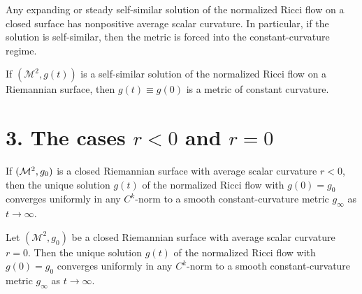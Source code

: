 \begin{proposition}
\label{ch05-prop-self-similar-solutions-constant-curvature}
Any expanding or steady self-similar solution of the normalized Ricci flow on a closed surface has nonpositive average scalar curvature. In particular, if the solution is self-similar, then the metric is forced into the constant-curvature regime.
\end{proposition}

\begin{proposition}
\label{ch05-prop-self-similar-constant-curvature}
If \((\mathcal{M}^2,g(t))\) is a self-similar solution of the normalized Ricci flow on a Riemannian surface, then \(g(t)\equiv g(0)\) is a metric of constant curvature.
\end{proposition}

\section*{3. The cases \(r<0\) and \(r=0\)}

\begin{theorem}
\label{ch05-thm-negative-average-curvature}
If \((\mathcal{M}^2,g_0)\) is a closed Riemannian surface with average scalar curvature \(r<0\), then the unique solution \(g(t)\) of the normalized Ricci flow with \(g(0)=g_0\) converges uniformly in any \(C^k\)-norm to a smooth constant-curvature metric \(g_\infty\) as \(t\to\infty\).
\end{theorem}

\begin{theorem}
\label{ch05-thm-zero-average-curvature}
Let \((\mathcal{M}^2,g_0)\) be a closed Riemannian surface with average scalar curvature \(r=0\). Then the unique solution \(g(t)\) of the normalized Ricci flow with \(g(0)=g_0\) converges uniformly in any \(C^k\)-norm to a smooth constant-curvature metric \(g_\infty\) as \(t\to\infty\).
\end{theorem}

